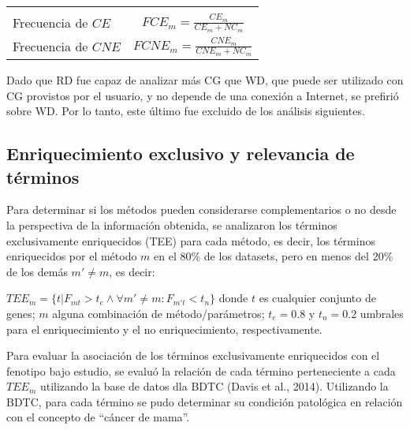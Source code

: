 \documentclass[12pt,twoside]{reedthesis}
\begin{document}
\begin{longtable}[]{@{}lc@{}}
\begin{minipage}[t]{0.50\columnwidth}
\end{minipage}\tabularnewline
\begin{minipage}[t]{0.44\columnwidth}\raggedright
Frecuencia de \(CE\)\strut
\end{minipage} & \begin{minipage}[t]{0.50\columnwidth}\centering
\(FCE_m=\frac{CE_m}{CE_m+NC_m}\)\strut
\end{minipage}\tabularnewline
\begin{minipage}[t]{0.44\columnwidth}\raggedright
Frecuencia de \(CNE\)\strut
\end{minipage} & \begin{minipage}[t]{0.50\columnwidth}\centering
\(FCNE_m=\frac{CNE_m}{CNE_m+NC_m}\)\strut
\end{minipage}\tabularnewline
\bottomrule
\end{longtable}
\par

Dado que RD fue capaz de analizar más CG que WD, que puede ser utilizado con CG provistos por el usuario, y no depende de una conexión a Internet, se prefirió sobre WD. Por lo tanto, este último fue excluido de los análisis siguientes.

\hypertarget{enriquecimiento-exclusivo-y-relevancia-de-tuxe9rminos}{%
\subsection{Enriquecimiento exclusivo y relevancia de términos}\label{enriquecimiento-exclusivo-y-relevancia-de-tuxe9rminos}}

\par

Para determinar si los métodos pueden considerarse complementarios o no desde la perspectiva de la información obtenida, se analizaron los términos exclusivamente enriquecidos (TEE) para cada método, es decir, los términos enriquecidos por el método \(m\) en el 80\% de los datasets, pero en menos del 20\% de los demás \(m' \neq m\), es decir:

\(TEE_m=\{t|F_{mt}>t_e \wedge \forall m' \neq m : F_{m't} < t_n \}\)
donde \(t\) es cualquier conjunto de genes; \(m\) alguna combinación de método/parámetros; \(t_e=0.8\) y \(t_n=0.2\) umbrales para el enriquecimiento y el no enriquecimiento, respectivamente.

\par

Para evaluar la asociación de los términos exclusivamente enriquecidos con el fenotipo bajo estudio, se evaluó la relación de cada término perteneciente a cada \(TEE_m\) utilizando la base de datos dla BDTC (Davis et al., 2014). Utilizando la BDTC, para cada término se pudo determinar su condición patológica en relación con el concepto de ``cáncer de mama''.
\end{document}
